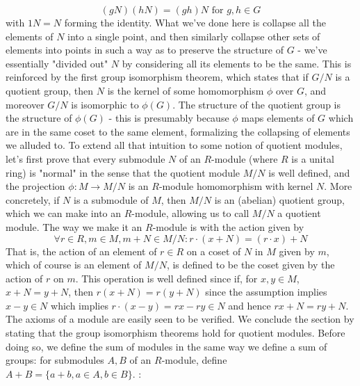 \documentclass{article}
\begin{document}
$$ (g N)(h N) = (g h) N \text{ for } g, h \in G $$
with $ 1 N = N $ forming the identity. What we've done here is collapse all the elements of $ N $ into a single point, and then similarly collapse other sets of elements into points in such a way as to preserve the structure of $ G $ - we've essentially "divided out" $ N $ by considering all its elements to be the same. This is reinforced by the first group isomorphism theorem, which states that if $ G / N $ is a quotient group, then $ N $ is the kernel of some homomorphism $ \phi $ over $ G $, and moreover $ G / N $ is isomorphic to $ \phi(G) $. The structure of the quotient group is the structure of $ \phi(G) $ - this is presumably because $ \phi $ maps elements of $ G $ which are in the same coset to the same element, formalizing the collapsing of elements we alluded to.
\n
To extend all that intuition to some notion of quotient modules, let's first prove that every submodule $ N $ of an $ R $-module (where $ R $ is a unital ring) is "normal" in the sense that the quotient module $ M / N $ is well defined, and the projection $ \phi: M \rightarrow M / N $ is an $ R $-module homomorphism with kernel $ N $. More concretely, if $ N $ is a submodule of $ M $, then $ M / N $ is an (abelian) quotient group, which we can make into an $ R $-module, allowing us to call $ M / N $ a quotient module. The way we make it an $ R $-module is with the action given by
$$ \forall r \in R, m \in M, m + N \in M / N: r \cdot (x + N) = (r \cdot x) + N $$
That is, the action of an element of $ r \in R $ on a coset of $ N $ in $ M $ given by $ m $, which of course is an element of $ M / N $, is defined to be the coset given by the action of $ r $ on $ m $. This operation is well defined since if, for $ x, y \in M $, $ x + N = y + N $, then $ r (x + N) = r (y + N) $ since the assumption implies $ x - y \in N $ which implies $ r \cdot (x - y) = r x - r y \in N $ and hence $ r x + N = r y + N $. The axioms of a module are easily seen to be verified.
\n
We conclude the section by stating that the group isomorphism theorems hold for quotient modules. Before doing so, we define the sum of modules in the same way we define a sum of groups: for submodules $ A, B $ of an $ R $-module, define $ A + B = \{ a + b, a \in A, b \in B \} $.
\nn
{}: 
\end{document}
